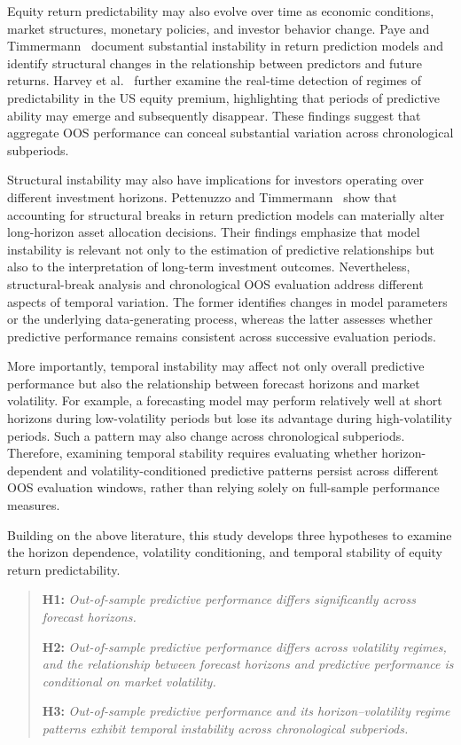 \documentclass[12pt,twoside]{ord}
\begin{document}
Equity return predictability may also evolve over time as economic conditions, market structures, monetary policies, and investor behavior change. Paye and Timmermann~\cite{paye2006} document substantial instability in return prediction models and identify structural changes in the relationship between predictors and future returns. Harvey et al.~\cite{harvey2021} further examine the real-time detection of regimes of predictability in the US equity premium, highlighting that periods of predictive ability may emerge and subsequently disappear. These findings suggest that aggregate OOS performance can conceal substantial variation across chronological subperiods.

Structural instability may also have implications for investors operating over different investment horizons. Pettenuzzo and Timmermann~\cite{pettenuzzo2011} show that accounting for structural breaks in return prediction models can materially alter long-horizon asset allocation decisions. Their findings emphasize that model instability is relevant not only to the estimation of predictive relationships but also to the interpretation of long-term investment outcomes. Nevertheless, structural-break analysis and chronological OOS evaluation address different aspects of temporal variation. The former identifies changes in model parameters or the underlying data-generating process, whereas the latter assesses whether predictive performance remains consistent across successive evaluation periods.

More importantly, temporal instability may affect not only overall predictive performance but also the relationship between forecast horizons and market volatility. For example, a forecasting model may perform relatively well at short horizons during low-volatility periods but lose its advantage during high-volatility periods. Such a pattern may also change across chronological subperiods. Therefore, examining temporal stability requires evaluating whether horizon-dependent and volatility-conditioned predictive patterns persist across different OOS evaluation windows, rather than relying solely on full-sample performance measures.

Building on the above literature, this study develops three hypotheses to examine the horizon dependence, volatility conditioning, and temporal stability of equity return predictability.

\begin{quote}
\noindent\textbf{H1:} \textit{Out-of-sample predictive performance differs significantly across forecast horizons.}

\medskip
\noindent\textbf{H2:} \textit{Out-of-sample predictive performance differs across volatility regimes, and the relationship between forecast horizons and predictive performance is conditional on market volatility.}

\medskip
\noindent\textbf{H3:} \textit{Out-of-sample predictive performance and its horizon--volatility regime patterns exhibit temporal instability across chronological subperiods.}
\end{quote}
\end{document}
